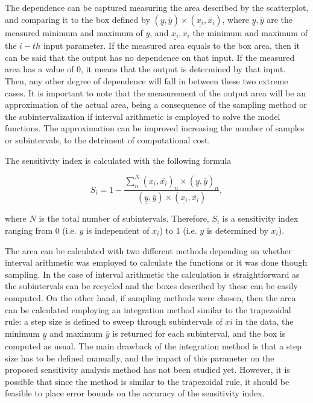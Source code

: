 \documentclass[twocolumn]{rps-esrel2022}
\begin{document}
The dependence can be captured measuring the area described by the scatterplot, and comparing it to the box defined by $(\underline{y},\overline{y})\times(\underline{x_i},\overline{x_i})$,
where $\underline{y},\overline{y}$ are the measured minimum and maximum of $y$, and $\underline{x_i},\overline{x_i}$ the minimum and maximum of the $i-th$ input parameter.
If the measured area equals to the box area, then it can be said that the output has no dependence on that input.
If the measured area has a value of 0, it means that the output is determined by that input.
Then, any other degree of dependence will fall in between these two extreme cases.
It is important to note that the measurement of the output area will be an approximation of the actual area, being a consequence of the sampling method or the subintervalization
if interval arithmetic is employed to solve the model functions.
The approximation can be improved increasing the number of samples or subintervals, to the detriment of computational cost.

The sensitivity index is calculated with the following formula

\begin{equation}
	S_i = 1 - \frac{\sum_n^N(\underline{x_i},\overline{x_i})_n\times(\underline{y},\overline{y})_n}{(\underline{y},\overline{y})\times(\underline{x_i},\overline{x_i})}{,}
\end{equation}

where $N$ is the total number of subintervals.
Therefore, $S_i$ is a sensitivity index ranging from 0 (i.e. $y$ is independent of $x_i$) to 1 (i.e. $y$ is determined by $x_i$).

The area can be calculated with two different methods depending on whether interval arithmetic was employed to calculate the functions or it was done though sampling.
In the case of interval arithmetic the calculation is straightforward as the subintervals can be recycled and the boxes described by these can be easily computed.
On the other hand, if sampling methods were chosen, then the area can be calculated employing an integration method similar to the trapezoidal rule: a step size is defined to
sweep through subintervals of $xi$ in the data, the minimum $\underline{y}$ and maximum $\overline{y}$ is returned for each subinterval, and the box is computed as usual.
The main drawback of the integration method is that a step size has to be defined manually, and the impact of this parameter on the proposed sensitivity analysis method has not
been studied yet.
However, it is possible that since the method is similar to the trapezoidal rule, it should be feasible to place error bounds on the accuracy of the sensitivity index.
\end{document}
